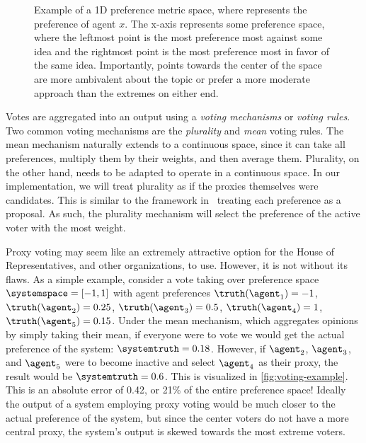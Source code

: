 \begin{figure}[htbp]
    \centering
    
    \caption{
        Example of a 1D preference metric space, where  represents the
        preference of agent $x$.
        The x-axis represents some preference space, where the leftmost point is
        the most preference most against some idea and the rightmost point is the most
        preference most in favor of the same idea.
        Importantly, points towards the center of the space are more ambivalent about
        the topic or prefer a more moderate approach than the extremes on either end.
    }
    \label{fig:system-metric-space}
\end{figure}

Votes are aggregated into an output using a \textit{voting mechanisms} or
\textit{voting rules}.
Two common voting mechanisms are the \textit{plurality} and \textit{mean} voting rules.
The mean mechanism naturally extends to a continuous space, since it can take all
preferences, multiply them by their weights, and then average them.
Plurality, on the other hand, needs to be adapted to operate in a continuous space.
In our implementation, we will treat plurality as if the proxies themselves were
candidates.
This is similar to the framework in~\cite{Bulteau2021} treating each preference as a
proposal.
As such, the plurality mechanism will select the preference of the active voter with
the most weight.

Proxy voting may seem like an extremely attractive option for the House of
Representatives, and other organizations, to use.
However, it is not without its flaws.
As a simple example, consider a vote taking over preference
space $\systemspace = [-1, 1]$ with agent preferences $\truthof{\agent_1} = -1$,
$\truthof{\agent_2} = 0.25$, $\truthof{\agent_3} = 0.5$, $\truthof{\agent_4} = 1$,
$\truthof{\agent_5} = 0.15$.
Under the mean mechanism, which aggregates opinions by simply taking their mean, if
everyone were to vote we would get the actual preference of the
system: $\systemtruth = 0.18$.
However, if $\agent_2$, $\agent_3$, and $\agent_5$ were to become inactive and select
$\agent_4$ as their proxy, the result would be $\systemtruth = 0.6$.
This is visualized in \autoref{fig:voting-example}.
This is an absolute error of 0.42, or 21\% of the entire preference space!
Ideally the output of a system employing proxy voting would be much closer to the
actual preference of the system, but since the center voters do not have a more
central proxy, the system's output is skewed towards the most extreme voters.

